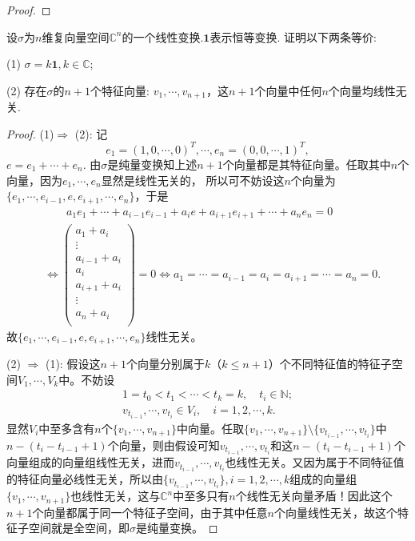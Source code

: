 \documentclass[../../main.tex]{subfiles}%
\begin{document}
\begin{proof}
\end{proof}

\begin{example}
设\(\sigma\)为\(n\)维复向量空间\(\mathbb{C}^n\)的一个线性变换.\(\mathbf{1}\)表示恒等变换. 证明以下两条等价:

(1) \(\sigma = k\mathbf{1}, k \in \mathbb{C}\);

(2) 存在\(\sigma\)的\(n + 1\)个特征向量: \(v_1, \cdots, v_{n+1}\)，这\(n + 1\)个向量中任何\(n\)个向量均线性无关.
\end{example}
\begin{proof}

(1)$\Longrightarrow$ (2): 记
$$e_1=(1,0,\cdots,0)^T,\cdots,e_n=(0,0,\cdots,1)^T,$$
$e=e_1+\cdots+e_n$.
由$\sigma$是纯量变换知上述$n+1$个向量都是其特征向量。任取其中$n$个向量，因为$e_1,\cdots,e_n$显然是线性无关的，
所以可不妨设这$n$个向量为$\{e_1,\cdots,e_{i-1},e,e_{i+1},\cdots,e_n\}$，于是
\begin{align*}
&\quad \quad a_1e_1+\cdots +a_{i-1}e_{i-1}+a_ie+a_{i+1}e_{i+1}+\cdots +a_ne_n=0
\\
&\Longleftrightarrow \left( \begin{array}{c}
a_1+a_i\\
\vdots\\
a_{i-1}+a_i\\
a_i\\
a_{i+1}+a_i\\
\vdots\\
a_n+a_i\\
\end{array} \right) =0\Longleftrightarrow a_1=\cdots =a_{i-1}=a_i=a_{i+1}=\cdots =a_n=0.
\end{align*}
故$\{e_1,\cdots,e_{i-1},e,e_{i+1},\cdots,e_n\}$线性无关。

(2) $\Longrightarrow$ (1): 假设这$n+1$个向量分别属于$k$（$k\leqslant n+1$）个不同特征值的特征子空间$V_1,\cdots,V_k$中。不妨设
\begin{gather*}
1=t_0<t_1<\cdots<t_k=k,\quad t_i\in \mathbb{N};
\\
v_{t_{i-1}},\cdots,v_{t_i}\in V_i,\quad i=1,2,\cdots,k.
\end{gather*}
显然$V_i$中至多含有$n$个$\{v_1,\cdots,v_{n+1}\}$中向量。任取$\{v_1,\cdots,v_{n+1}\}\setminus\{v_{t_{i-1}},\cdots,v_{t_i}\}$中$n-(t_i-t_{i-1}+1)$个向量，则由假设可知$v_{t_{i-1}},\cdots,v_{t_i}$和这$n-(t_i-t_{i-1}+1)$个向量组成的向量组线性无关，进而$v_{t_{i-1}},\cdots,v_{t_i}$也线性无关。又因为属于不同特征值的特征向量必线性无关，所以由$\{v_{t_{i-1}},\cdots,v_{t_i}\},i=1,2,\cdots,k$组成的向量组$\{v_1,\cdots,v_{n+1}\}$也线性无关，这与$\mathbb{C}^n$中至多只有$n$个线性无关向量矛盾！因此这个$n+1$个向量都属于同一个特征子空间，由于其中任意$n$个向量线性无关，故这个特征子空间就是全空间，即$\sigma$是纯量变换。

\end{proof}
\end{document}
